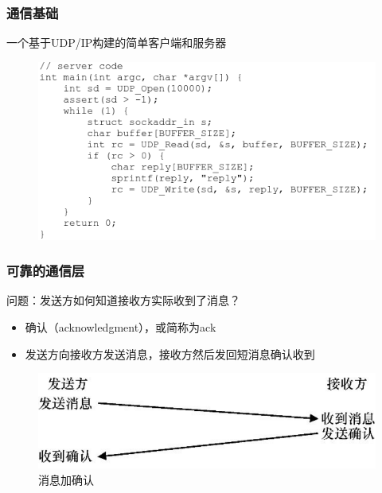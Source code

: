 \begin{frame}[fragile]
    \frametitle{通信基础}
    一个基于UDP/IP构建的简单客户端和服务器
    \begin{figure}
        \includegraphics[width=0.8\linewidth]{figs/udp-server.png}
    \end{figure}
\end{frame}
\begin{frame}[fragile]
    \frametitle{可靠的通信层}
    问题：发送方如何知道接收方实际收到了消息？ 
    \begin{itemize}
        \item 确认（acknowledgment），或简称为ack
        \item     发送方向接收方发送消息，接收方然后发回短消息确认收到
    \end{itemize}
    
    \begin{figure}
        \includegraphics[width=0.8\linewidth]{figs/ack.png}
        \caption{消息加确认}
    \end{figure}
\end{frame}
